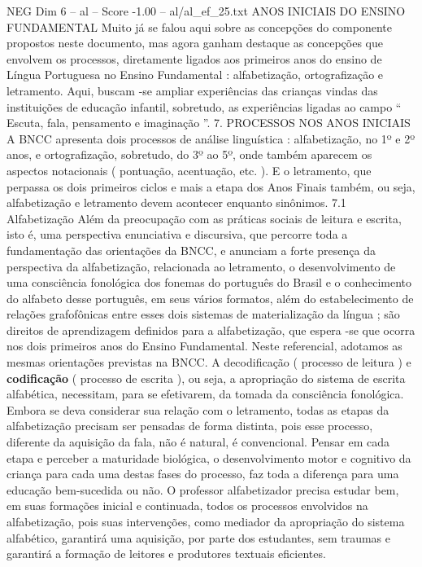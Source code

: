\begin{textsample}{NEG Dim 6 – al – Score -1.00 – al/al\_ef\_25.txt}  \label{ex:f6_neg_062}
ANOS INICIAIS DO ENSINO FUNDAMENTAL Muito já se falou aqui sobre as concepções do componente propostos neste documento, mas agora ganham destaque as concepções que envolvem os processos, diretamente ligados aos primeiros anos do ensino de Língua Portuguesa no Ensino Fundamental : alfabetização, ortografização e letramento.
Aqui, buscam -se ampliar experiências das crianças vindas das instituições de educação infantil, sobretudo, as experiências ligadas ao campo “ Escuta, fala, pensamento e imaginação ”. 7.
PROCESSOS NOS ANOS INICIAIS A BNCC apresenta dois processos de análise linguística : alfabetização, no 1º e 2º anos, e ortografização, sobretudo, do 3º ao 5º, onde também aparecem os aspectos notacionais ( pontuação, acentuação, etc. ).
E o letramento, que perpassa os dois primeiros ciclos e mais a etapa dos Anos Finais também, ou seja, alfabetização e letramento devem acontecer enquanto sinônimos. 7.1 Alfabetização Além da preocupação com as práticas sociais de leitura e escrita, isto é, uma perspectiva enunciativa e discursiva, que percorre toda a fundamentação das orientações da BNCC, e anunciam a forte presença da perspectiva da alfabetização, relacionada ao letramento, o desenvolvimento de uma consciência fonológica dos fonemas do português do Brasil e o conhecimento do alfabeto desse português, em seus vários formatos, além do estabelecimento de relações grafofônicas entre esses dois sistemas de materialização da língua ; são direitos de aprendizagem definidos para a alfabetização, que espera -se que ocorra nos dois primeiros anos do Ensino Fundamental.
Neste referencial, adotamos as mesmas orientações previstas na BNCC.
A decodificação ( processo de leitura ) e \textbf{codificação} ( processo de escrita ), ou seja, a apropriação do sistema de escrita alfabética, necessitam, para se efetivarem, da tomada da consciência fonológica.
Embora se deva considerar sua relação com o letramento, todas as etapas da alfabetização precisam ser pensadas de forma distinta, pois esse processo, diferente da aquisição da fala, não é natural, é convencional.
Pensar em cada etapa e perceber a maturidade biológica, o desenvolvimento motor e cognitivo da criança para cada uma destas fases do processo, faz toda a diferença para uma educação bem-sucedida ou não.
O professor alfabetizador precisa estudar bem, em suas formações inicial e continuada, todos os processos envolvidos na alfabetização, pois suas intervenções, como mediador da apropriação do sistema alfabético, garantirá uma aquisição, por parte dos estudantes, sem traumas e garantirá a formação de leitores e produtores textuais eficientes.

\end{textsample}
